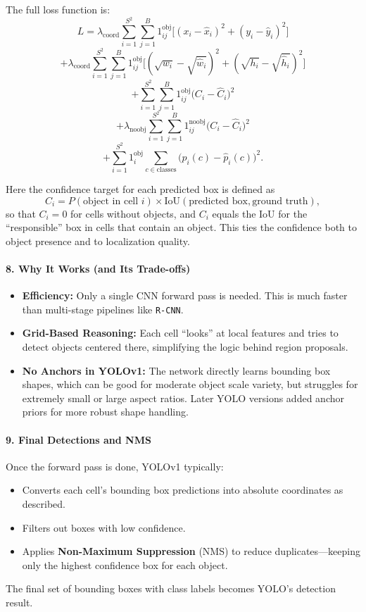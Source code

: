 \begin{enrichment}
\begin{enrichment}
    The full loss function is:
    \[
    L = \lambda_{\text{coord}} \sum_{i=1}^{S^2} \sum_{j=1}^{B} 1^{\text{obj}}_{ij} \bigl[(x_i - \hat{x}_i)^2 + (y_i - \hat{y}_i)^2\bigr]
    \]
    \[
    + \lambda_{\text{coord}} \sum_{i=1}^{S^2}\sum_{j=1}^{B} 1^{\text{obj}}_{ij} \bigl[(\sqrt{w_i} - \sqrt{\hat{w}_i})^2 + (\sqrt{h_i} - \sqrt{\hat{h}_i})^2\bigr]
    \]
    \[
    + \sum_{i=1}^{S^2}\sum_{j=1}^{B} 1^{\text{obj}}_{ij} \bigl(C_i - \hat{C}_i\bigr)^2
    \]
    \[
    + \lambda_{\text{noobj}} \sum_{i=1}^{S^2}\sum_{j=1}^{B} 1^{\text{noobj}}_{ij} \bigl(C_i - \hat{C}_i\bigr)^2
    \]
    \[
    + \sum_{i=1}^{S^2} 1^{\text{obj}}_{i} \sum_{c \in \text{classes}} \bigl(p_i(c) - \hat{p}_i(c)\bigr)^2.
    \]
    
    Here the confidence target for each predicted box is defined as
    \[
    C_i = P(\text{object in cell } i) \times \mathrm{IoU}(\text{predicted box}, \text{ground truth}),
    \]
    so that \(C_i = 0\) for cells without objects, and \(C_i\) equals the IoU for the “responsible” box in cells that contain an object. This ties the confidence both to object presence and to localization quality.
    
    \paragraph{8. Why It Works (and Its Trade-offs)}
    \begin{itemize}
        \item \textbf{Efficiency:} Only a single CNN forward pass is needed. This is much faster than multi-stage pipelines like \texttt{R-CNN}.
        \item \textbf{Grid-Based Reasoning:} Each cell “looks” at local features and tries to detect objects centered there, simplifying the logic behind region proposals.
        \item \textbf{No Anchors in YOLOv1:} The network directly learns bounding box shapes, which can be good for moderate object scale variety, but struggles for extremely small or large aspect ratios. Later YOLO versions added anchor priors for more robust shape handling.
    \end{itemize}
    
    \paragraph{9. Final Detections and NMS}
    Once the forward pass is done, YOLOv1 typically:
    \begin{itemize}
        \item Converts each cell’s bounding box predictions into absolute coordinates as described.
        \item Filters out boxes with low confidence.
        \item Applies \textbf{Non-Maximum Suppression} (NMS) to reduce duplicates—keeping only the highest confidence box for each object.
    \end{itemize}
    The final set of bounding boxes with class labels becomes YOLO’s detection result.
    

\end{enrichment}
\end{enrichment}

